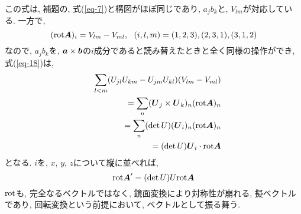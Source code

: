 \documentclass{jsarticle}
\newcommand*{\mbold}[1]{\mbox{\boldmath $#1$}}
\newcommand*{\rot}{{\rm rot}}
\begin{document}
この式は, 補題の, 式(\ref{eq-7})と構図がほぼ同じであり, $a_j b_k$と, $V_{lm}$が対応している. 
一方で, 
\begin{equation}
  (\rot \mbold{A})_i = V_{lm} - V_{ml}, 
  ~~ (i, l, m) = (1, 2, 3), (2, 3, 1), (3, 1, 2)
\end{equation}
なので, $a_j b_k$を, $\mbold{a} \times \mbold{b}$の$i$成分であると読み替えたときと全く同様の操作ができ, 
式(\ref{eq-18})は, 
\begin{eqnarray}\label{eq-18}
  && \sum_{l < m} (U_{jl}U_{km} - U_{jm}U_{kl})(V_{lm} - V_{ml}) \nonumber \\
  && = \sum_n (\mbold{U}_j \times \mbold{U}_k)_n (\rot\mbold{A})_n \nonumber \\
  && = \sum_n (\det U)(\mbold{U}_i)_n (\rot\mbold{A})_n \nonumber \\
  && = (\det U)\mbold{U}_i \cdot \rot\mbold{A}
\end{eqnarray}
となる. $i$を, $x$, $y$, $z$について縦に並べれば, 
\begin{equation}
  \rot\mbold{A}^\prime = (\det U)U\rot\mbold{A}
\end{equation}
$\rot$も, 完全なるベクトルではなく, 鏡面変換により対称性が崩れる, 擬ベクトルであり, 回転変換という前提において, ベクトルとして振る舞う. 
\end{document}
